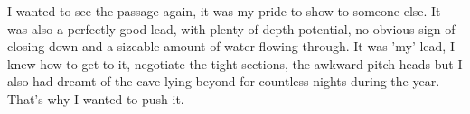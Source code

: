I wanted to see the passage again, it was my pride to show to someone else. It was also a perfectly good lead, with plenty of depth potential, no obvious sign of closing down and a sizeable amount of water flowing through. It was 'my' lead, I knew how to get to it, negotiate the tight sections, the awkward pitch heads but I also had dreamt of the cave lying beyond for countless nights during the year. That's why I wanted to push it.
